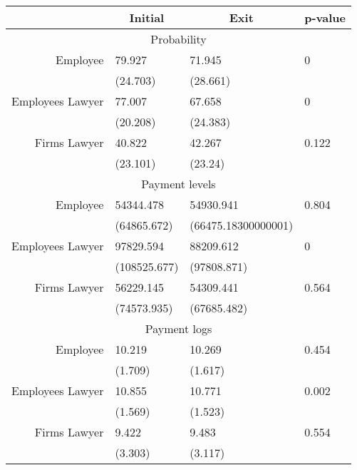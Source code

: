 \begin{tabular}{rrrr}
\toprule
      & \multicolumn{1}{c}{Initial} & \multicolumn{1}{c}{Exit} & \multicolumn{1}{c}{p-value} \\
\midrule
\multicolumn{4}{c}{Probability} \\
Employee  & \multicolumn{1}{l}{79.927} & \multicolumn{1}{l}{71.945} & \multicolumn{1}{l}{0} \\
      & \multicolumn{1}{l}{(24.703)} & \multicolumn{1}{l}{(28.661)} & \multicolumn{1}{l}{} \\
Employees Lawyer & \multicolumn{1}{l}{77.007} & \multicolumn{1}{l}{67.658} & \multicolumn{1}{l}{0} \\
      & \multicolumn{1}{l}{(20.208)} & \multicolumn{1}{l}{(24.383)} & \multicolumn{1}{l}{} \\
Firms Lawyer & \multicolumn{1}{l}{40.822} & \multicolumn{1}{l}{42.267} & \multicolumn{1}{l}{0.122} \\
      & \multicolumn{1}{l}{(23.101)} & \multicolumn{1}{l}{(23.24)} & \multicolumn{1}{l}{} \\
\multicolumn{4}{c}{Payment levels} \\
Employee  & \multicolumn{1}{l}{54344.478} & \multicolumn{1}{l}{54930.941} & \multicolumn{1}{l}{0.804} \\
      & \multicolumn{1}{l}{(64865.672)} & \multicolumn{1}{l}{(66475.18300000001)} & \multicolumn{1}{l}{} \\
Employees Lawyer & \multicolumn{1}{l}{97829.594} & \multicolumn{1}{l}{88209.612} & \multicolumn{1}{l}{0} \\
      & \multicolumn{1}{l}{(108525.677)} & \multicolumn{1}{l}{(97808.871)} & \multicolumn{1}{l}{} \\
Firms Lawyer & \multicolumn{1}{l}{56229.145} & \multicolumn{1}{l}{54309.441} & \multicolumn{1}{l}{0.564} \\
      & \multicolumn{1}{l}{(74573.935)} & \multicolumn{1}{l}{(67685.482)} & \multicolumn{1}{l}{} \\
\multicolumn{4}{c}{Payment logs} \\
Employee  & \multicolumn{1}{l}{10.219} & \multicolumn{1}{l}{10.269} & \multicolumn{1}{l}{0.454} \\
      & \multicolumn{1}{l}{(1.709)} & \multicolumn{1}{l}{(1.617)} & \multicolumn{1}{l}{} \\
Employees Lawyer & \multicolumn{1}{l}{10.855} & \multicolumn{1}{l}{10.771} & \multicolumn{1}{l}{0.002} \\
      & \multicolumn{1}{l}{(1.569)} & \multicolumn{1}{l}{(1.523)} & \multicolumn{1}{l}{} \\
Firms Lawyer & \multicolumn{1}{l}{9.422} & \multicolumn{1}{l}{9.483} & \multicolumn{1}{l}{0.554} \\
      & \multicolumn{1}{l}{(3.303)} & \multicolumn{1}{l}{(3.117)} & \multicolumn{1}{l}{} \\
\bottomrule
\end{tabular}%
